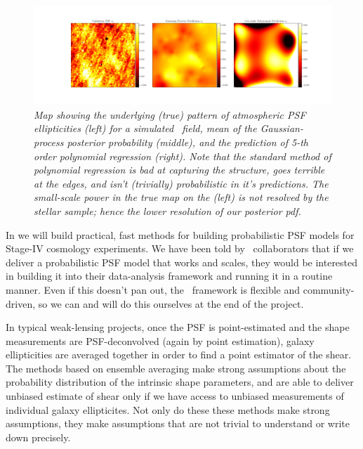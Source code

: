 \documentclass[12pt]{article}
\begin{document}
\begin{figure}[!ht]
\noindent\minipage{\textwidth}
  \includegraphics[width=\linewidth]{validation_e1.png}
\endminipage
\caption{\textsl{Map showing the underlying (true) pattern of atmospheric PSF ellipticities (left) for a simulated \lsst\ field,
mean of the Gaussian-process posterior probability (middle), and the prediction of 5-th
order polynomial regression (right).  Note that the standard method of polynomial regression is bad at capturing the structure, goes terrible at the edges, and isn't (trivially) probabilistic in it's predictions.  The small-scale power in the true map on the (left) is not resolved by the stellar sample; hence the lower resolution of our posterior pdf.}\label{3}}
\end{figure}

In  we will build practical, fast methods for
building probabilistic PSF models for Stage-IV cosmology experiments.
We have been told by \lsst\ collaborators that if we deliver a
probabilistic PSF model that works and scales, they would be
interested in building it into their data-analysis framework and
running it in a routine manner.  Even if this doesn't pan out, the
\lsst\ framework is flexible and community-driven, so we can and will
do this ourselves at the end of the project.

In typical weak-lensing projects, once the PSF is point-estimated
and the shape measurements are PSF-deconvolved (again by point estimation),
galaxy ellipticities
are averaged together in order to
find a point estimator of the shear.
The methods based on ensemble averaging make strong assumptions
about the probability distribution of the intrinsic shape parameters,
and are able to deliver unbiased estimate of shear only if we
have access to unbiased measurements of individual galaxy
ellipticites.
Not only do these these methods make strong assumptions, they make
assumptions that are not trivial to understand or write down precisely.
\end{document}

